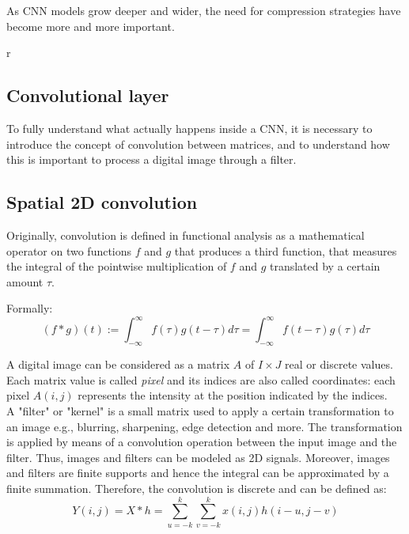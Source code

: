 As CNN models grow deeper and wider, the need for compression strategies have become more and more important. 

r\subsection{Convolutional layer} 
To fully understand what actually happens inside a CNN, it is necessary to introduce the concept of convolution between matrices, and to understand how this is important to process a digital image through a filter.

\subsection{Spatial 2D convolution}
Originally, convolution is defined in functional analysis as a mathematical operator on two functions $f$ and $g$ that produces a third function, that measures the integral of the pointwise multiplication of $f$ and $g$ translated by a certain amount $\tau$. 

Formally: 
\begin{equation}
    (f*g)(t):=\int_{-\infty}^{\infty} f(\tau)g(t-\tau) d\tau= \int_{-\infty}^{\infty} f(t-\tau)g(\tau) d\tau
\end{equation}


A digital image can be considered as a matrix $A$ of $I\times J$ real or discrete values. Each matrix value is called \emph{pixel} and its indices are also called coordinates: each pixel $A(i, j)$ represents the intensity at the position indicated by the indices. 
\\
A "filter" or "kernel"  is a small matrix used to apply a certain transformation to an image e.g., blurring, sharpening, edge detection and more. The transformation is applied by means of a convolution operation between the input image and the filter. Thus, images and filters can be modeled as 2D signals. Moreover, images and filters are finite supports and hence the integral can be approximated by a finite summation. Therefore, the  convolution is discrete and can be defined as: 
\begin{equation}
\label{eq:2Dconvolution}
    Y(i,j) = X* h = \sum_{u=-k}^{k} \sum_{v=-k}^{k}x(i,j) h(i-u,j-v)
\end{equation}

